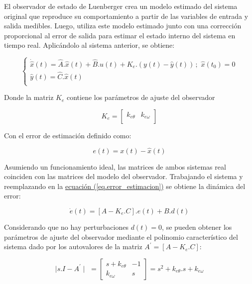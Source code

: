 \documentclass{article}
\begin{document}
El observador de estado de Luenberger crea un modelo estimado del sistema original que reproduce su 
comportamiento a partir de las variables de entrada y salida medibles. Luego, utiliza este modelo estimado 
junto con una corrección proporcional al error de salida para estimar el estado interno del sistema en 
tiempo real. Aplicándolo al sistema anterior, se obtiene:

\begin{equation}
    \begin{cases}
        \dot{\hat{x}}(t) = \hat{A}.\hat{x}(t) + \hat{B}.u(t) + K_e.(y(t) - \hat{y}(t)) \, ; \,\, \hat{x}(t_0) = 0\\
        \hat{y}(t) = \hat{C}.\hat{x}(t) \\
    \end{cases}
\end{equation}

Donde la matriz $K_e$ contiene los parámetros de ajuste del observador

\begin{equation}
    K_e = 
    \begin{bmatrix}
        k_{e\theta} & k_{e\omega} \\
    \end{bmatrix}
\end{equation}

Con el error de estimación definido como:

\begin{equation}\label{eq.error_estimacion}
    e(t) = x(t) - \hat{x}(t)
\end{equation}

Asumiendo un funcionamiento ideal, las matrices de ambos sistemas real coinciden con las matrices del
modelo del observador. Trabajando el sistema y reemplazando en la   
\hyperref[eq.error_estimacion]{ecuación (\ref*{eq.error_estimacion})}
se obtiene la dinámica del error:

\begin{equation}
    \dot{e}(t) = [A - K_e.C].e(t) + B.d(t)
\end{equation}

Considerando que no hay perturbaciones $d(t) = 0$, se pueden obtener los parámetros de ajuste del observador
mediante el polinomio característico del sistema dado por los autovalores de la matriz 
$A^\prime = [A - K_e.C]$:

\begin{equation}
    \mid s.I - A^\prime\mid \,\,= 
    \begin{bmatrix}
        s + k_{e\theta} & -1 \\
        k_{e\omega} & s 
    \end{bmatrix}
    = s^2 + k_{e\theta}.s + k_{e\omega}
\end{equation}
\end{document}
